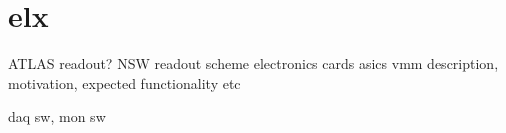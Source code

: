 
\section{elx}

ATLAS readout?
NSW readout scheme
electronics cards
asics
vmm description, motivation, expected functionality etc

daq sw, mon sw

